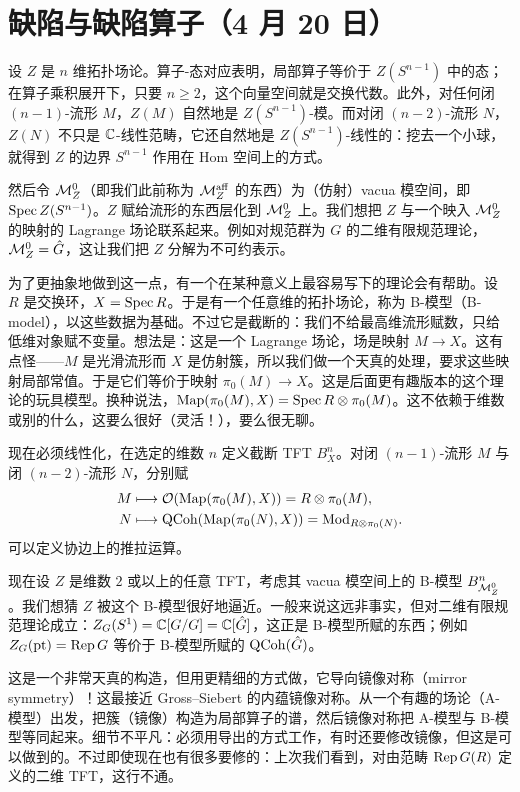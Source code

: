 \section[缺陷与缺陷算子]{缺陷与缺陷算子（4 月 20 日）}


设 $Z$ 是 $n$ 维拓扑场论。算子-态对应表明，局部算子等价于 $Z(S^{n-1})$ 中的态；在算子乘积展开下，只要 $n\ge2$，这个向量空间就是交换代数。此外，对任何闭 $(n-1)$-流形 $M$，$Z(M)$ 自然地是 $Z(S^{n-1})$-模。而对闭 $(n-2)$-流形 $N$，$Z(N)$ 不只是 $\mathbb{C}$-线性范畴，它还自然地是 $Z(S^{n-1})$-线性的：挖去一个小球，就得到 $Z$ 的边界 $S^{n-1}$ 作用在 Hom 空间上的方式。

然后令 $\mathcal{M}^0_Z$（即我们此前称为 $\mathcal{M}^{\mathrm{aff}}_Z$ 的东西）为（仿射）vacua 模空间，即 $\operatorname{Spec} Z(S^{n-1})$。$Z$ 赋给流形的东西层化到 $\mathcal{M}^0_Z$ 上。我们想把 $Z$ 与一个映入 $\mathcal{M}^0_Z$ 的映射的 Lagrange 场论联系起来。例如对规范群为 $G$ 的二维有限规范理论，$\mathcal{M}^0_Z=\hat G$，这让我们把 $Z$ 分解为不可约表示。

为了更抽象地做到这一点，有一个在某种意义上最容易写下的理论会有帮助。设 $R$ 是交换环，$X=\operatorname{Spec} R$。于是有一个任意维的拓扑场论，称为 B-模型（B-model），以这些数据为基础。不过它是截断的：我们不给最高维流形赋数，只给低维对象赋不变量。想法是：这是一个 Lagrange 场论，场是映射 $M\to X$。这有点怪——$M$ 是光滑流形而 $X$ 是仿射簇，所以我们做一个天真的处理，要求这些映射局部常值。于是它们等价于映射 $\pi_0(M)\to X$。这是后面更有趣版本的这个理论的玩具模型。换种说法，$\operatorname{Map}(\pi_0(M),X)=\operatorname{Spec} R\otimes\pi_0(M)$。这不依赖于维数或别的什么，这要么很好（灵活！），要么很无聊。

现在必须线性化，在选定的维数 $n$ 定义截断 TFT $B^n_X$。对闭 $(n-1)$-流形 $M$ 与闭 $(n-2)$-流形 $N$，分别赋
\begin{align*}
M&\longmapsto \mathcal{O}(\operatorname{Map}(\pi_0(M),X))=R\otimes\pi_0(M),\\
N&\longmapsto \mathrm{QCoh}(\operatorname{Map}(\pi_0(N),X))=\mathrm{Mod}_{R\otimes\pi_0(N)}.
\end{align*}
可以定义协边上的推拉运算。

现在设 $Z$ 是维数 $2$ 或以上的任意 TFT，考虑其 vacua 模空间上的 B-模型 $B^n_{\mathcal{M}^0_Z}$。我们想猜 $Z$ 被这个 B-模型很好地逼近。一般来说这远非事实，但对二维有限规范理论成立：$Z_G(S^1)=\mathbb{C}[G/G]=\mathbb{C}[\hat G]$，这正是 B-模型所赋的东西；例如 $Z_G(\mathrm{pt})=\operatorname{Rep} G$ 等价于 B-模型所赋的 $\mathrm{QCoh}(\hat G)$。

这是一个非常天真的构造，但用更精细的方式做，它导向镜像对称（mirror symmetry）！这最接近 Gross--Siebert 的内蕴镜像对称。从一个有趣的场论（A-模型）出发，把簇（镜像）构造为局部算子的谱，然后镜像对称把 A-模型与 B-模型等同起来。细节不平凡：必须用导出的方式工作，有时还要修改镜像，但这是可以做到的。不过即使现在也有很多要修的：上次我们看到，对由范畴 $\operatorname{Rep} G(R)$ 定义的二维 TFT，这行不通。

